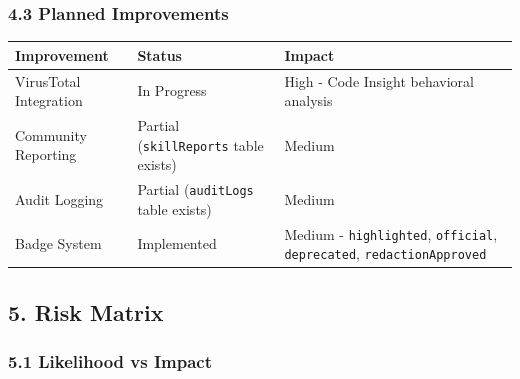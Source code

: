 \subsubsection{4.3 Planned Improvements}



\begin{table}[h]
\centering
\small
\begin{tabular}{|l|l|l|}
\hline
Improvement & Status & Impact \\
\hline
VirusTotal Integration & In Progress & High - Code Insight behavioral analysis \\
\hline
Community Reporting & Partial (\texttt{skillReports} table exists) & Medium \\
\hline
Audit Logging & Partial (\texttt{auditLogs} table exists) & Medium \\
\hline
Badge System & Implemented & Medium - \texttt{highlighted}, \texttt{official}, \texttt{deprecated}, \texttt{redactionApproved} \\
\hline
\end{tabular}
\end{table}



\hrulefill


\subsection{5. Risk Matrix}


\subsubsection{5.1 Likelihood vs Impact}



